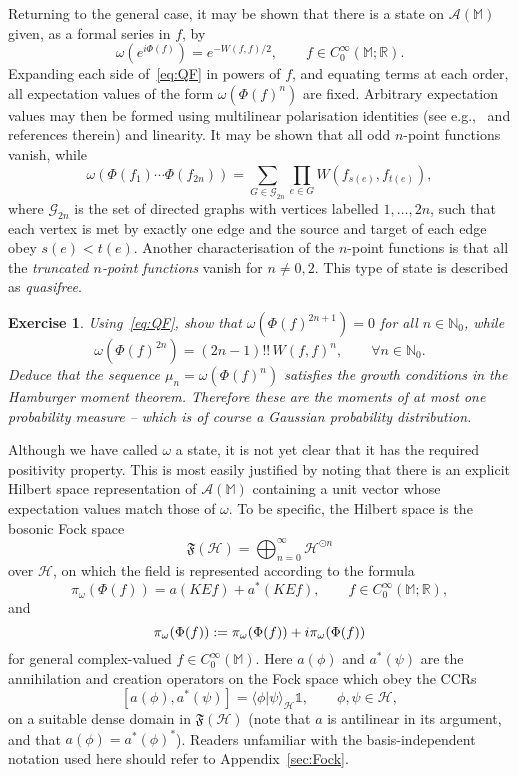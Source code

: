 \documentclass[12pt,a4paper]{article}
\let\Re\relax
\let\Im\relax
\DeclareMathOperator{\Re}{Re}
\DeclareMathOperator{\Im}{Im}
\newcommand{\1}{\mathds{1}}                         %
\newcommand{\NN}{\mathbb{N}}          %
\newcommand{\RR}{\mathbb{R}}           %
\newcommand{\MM}{\mathbb{M}}
\newcommand{\FF}{{\mathfrak{F}}}
\newcommand{\HH}{{\mathcal{H}}}
\newcommand{\II}{{\mathbb{1}}}
\newcommand{\Ac}{{\mathcal{A}}}
\newcommand{\CoinX}[1]{C_0^\infty(#1)}
\newcommand{\ip}[2]{\langle #1|#2\rangle}
\newtheorem{exercise}[theorem]{Exercise}
\begin{document}
Returning to the general case, it may be shown that there is a state on $\Ac(\MM)$ given, as a formal series in $f$, by 
\begin{equation}\label{eq:QF}
\omega (e^{i\Phi(f)}) = e^{-W(f,f)/2},\qquad f\in\CoinX{\MM;\RR}.
\end{equation}
Expanding each side of~\eqref{eq:QF} in powers of $f$, and equating terms at each order, all expectation values of the form $\omega(\Phi(f)^n)$ are fixed. Arbitrary expectation values may then be formed using multilinear polarisation identities (see e.g.,~\cite{Thomas:2014} and references therein) and linearity.
It may be shown that all odd $n$-point functions vanish, while
\[
\omega(\Phi(f_1)\cdots\Phi(f_{2n}))= \sum_{G\in\mathcal{G}_{2n}} \prod_{e\in G}
W(f_{s(e)},f_{t(e)}),
\]
where $\mathcal{G}_{2n}$ is the set of directed graphs with vertices labelled $1,\ldots,2n$, such that each vertex is met by exactly one edge and the source and target of each edge obey $s(e)<t(e)$. Another characterisation of the $n$-point functions is that all the \emph{truncated $n$-point functions} vanish for $n\neq 0,2$.
This type of state is described as \emph{quasifree}. 
\begin{exercise}
	Using~\eqref{eq:QF}, show that $\omega(\Phi(f)^{2n+1})=0$ for all $n\in\NN_0$, while 
	\[
	\omega(\Phi(f)^{2n}) = (2n-1)!!\, W(f,f)^n, \qquad\forall n\in\NN_0.
	\]
	Deduce that the sequence $\mu_n = \omega(\Phi(f)^n)$ satisfies the growth conditions in the Hamburger moment theorem. Therefore these are the moments of at most one probability measure -- which is of course a Gaussian probability distribution.
\end{exercise}

Although we have called $\omega$ a state, it is not yet clear that it has the required positivity property. This is most easily justified by noting that there is an explicit Hilbert space representation of $\Ac(\MM)$ containing a unit vector whose expectation values match those of $\omega$. To be specific, the Hilbert space is
the bosonic Fock space 
\begin{equation}\label{eq:qfF}
\FF(\HH) = \bigoplus_{n=0}^\infty \HH^{\odot n}
\end{equation}
over $\HH$, on which the field is represented according to the formula
\begin{equation}\label{eq:qfpi}
\pi_\omega(\Phi(f)) = a(KE f) + a^*(KEf)  ,\qquad f\in\CoinX{\MM;\RR},
\end{equation}
and
\[
\pi_\omega(\Phi(f)):=\pi_\omega(\Phi(\Re f)) + i\pi_\omega(\Phi(\Im f))
\]
for general complex-valued $f\in\CoinX{\MM}$.
Here $a(\phi)$ and $a^*(\psi)$ are the annihilation and creation operators on the Fock space which obey the CCRs
\begin{equation}\label{eq:CCRs}
[a(\phi),a^*(\psi)] = \ip{\phi}{\psi}_\HH\II, \qquad \phi,\psi\in\HH,
\end{equation}
on a suitable dense domain in $\FF(\HH)$ 
(note that $a$ is antilinear in its argument, and that $a(\phi)=a^*(\phi)^*$). Readers unfamiliar with the basis-independent notation used here should refer to Appendix~\ref{sec:Fock}. 
\end{document}
